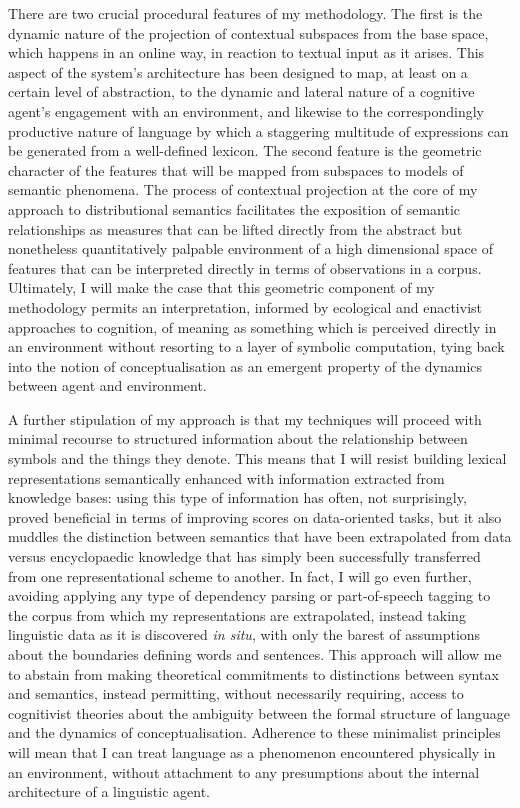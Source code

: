There are two crucial procedural features of my methodology.  The first is the dynamic nature of the projection of contextual subspaces from the base space, which happens in an online way, in reaction to textual input as it arises.  This aspect of the system's architecture has been designed to map, at least on a certain level of abstraction, to the dynamic and lateral nature of a cognitive agent's engagement with an environment, and likewise to the correspondingly productive nature of language by which a staggering multitude of expressions can be generated from a well-defined lexicon.  The second feature is the geometric character of the features that will be mapped from subspaces to models of semantic phenomena.  The process of contextual projection at the core of my approach to distributional semantics facilitates the exposition of semantic relationships as measures that can be lifted directly from the abstract but nonetheless quantitatively palpable environment of a high dimensional space of features that can be interpreted directly in terms of observations in a corpus.  Ultimately, I will make the case that this geometric component of my methodology permits an interpretation, informed by ecological and enactivist approaches to cognition, of meaning as something which is perceived directly in an environment without resorting to a layer of symbolic computation, tying back into the notion of conceptualisation as an emergent property of the dynamics between agent and environment.

A further stipulation of my approach is that my techniques will proceed with minimal recourse to structured information about the relationship between symbols and the things they denote.  This means that I will resist building lexical representations semantically enhanced with information extracted from knowledge bases: using this type of information has often, not surprisingly, proved beneficial in terms of improving scores on data-oriented tasks, but it also muddles the distinction between semantics that have been extrapolated from data versus encyclopaedic knowledge that has simply been successfully transferred from one representational scheme to another.  In fact, I will go even further, avoiding applying any type of dependency parsing or part-of-speech tagging to the corpus from which my representations are extrapolated, instead taking linguistic data as it is discovered \emph{in situ}, with only the barest of assumptions about the boundaries defining words and sentences.  This approach will allow me to abstain from making theoretical commitments to distinctions between syntax and semantics, instead permitting, without necessarily requiring, access to cognitivist theories about the ambiguity between the formal structure of language and the dynamics of conceptualisation.  Adherence to these minimalist principles will mean that I can treat language as a phenomenon encountered physically in an environment, without attachment to any presumptions about the internal architecture of a linguistic agent.

